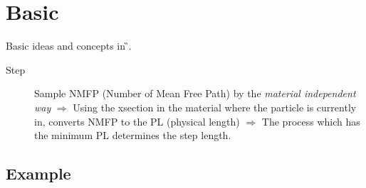 \section{Basic}
Basic ideas and concepts in \G{}.

\begin{description}
    \item [Step]
	Sample NMFP (Number of Mean Free Path) by the \emph{material independent way}	$\Rightarrow$ Using the xsection in the material where the particle is currently in, converts NMFP to the PL (physical length) $\Rightarrow$ The process which has the minimum PL determines the step length.
\end{description}
\subsection{Example}
